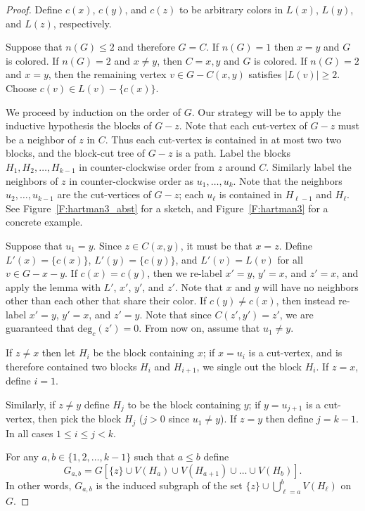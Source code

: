 \documentclass[12pt,letterpaper]{article}
\theoremstyle{plain}
\theoremstyle{definition}
\theoremstyle{break}
\begin{document}
\begin{proof}
Define $c(x)$, $c(y)$, and $c(z)$ to be arbitrary colors in $L(x)$,
$L(y)$, and $L(z)$, respectively.

Suppose that $n(G)\le 2$ and therefore $G=C$.
If $n(G)=1$ then $x=y$ and $G$ is colored.
If $n(G)= 2$ and $x\ne y$, then $C=x,y$ and $G$ is colored.
If $n(G)=2$ and $x=y$, then the remaining vertex
$v\in G-C(x,y)$ satisfies $|L(v)|\ge 2$. Choose $c(v)\in L(v)-\{c(x)\}$.

We proceed by induction on the order of $G$.
Our strategy will be to apply the inductive hypothesis
the blocks of $G-z$.
Note that each cut-vertex of $G-z$
must be a neighbor of $z$ in $C$.
Thus each cut-vertex is contained in at most two
two blocks, and the block-cut tree of $G-z$ is a path.
Label the blocks $H_1,H_2,\ldots,H_{k-1}$ in counter-clockwise
order from $z$ around $C$. Similarly label the neighbors
of $z$ in counter-clockwise order as $u_1,\ldots,u_{k}$. Note that
the neighbors $u_2,\ldots,u_{k-1}$ are the cut-vertices of $G-z$; each
$u_\ell$ is contained in $H_{\ell-1}$ and $H_{\ell}$. See
Figure~\ref{F:hartman3_abst} for a sketch, and Figure~\ref{F:hartman3} for a
concrete example.

Suppose that $u_1=y$. Since $z\in C(x,y)$, it must be that $x=z$.
Define $L'(x)=\{c(x)\}$, $L'(y)=\{c(y)\}$,
and $L'(v)=L(v)$ for all $v\in G-x-y$. 
If $c(x)=c(y)$, then we re-label $x'=y$, $y'=x$, and $z'=x$,
and apply the lemma with $L'$, $x'$, $y'$, and $z'$.
Note that $x$ and $y$ will have no
neighbors other than each other
that share their color. If $c(y)\ne c(x)$, then instead re-label $x'=y$,
$y'=x$, and $z'=y$. Note that since $C(z',y')=z'$, we are guaranteed that
$\text{deg}_c(z')=0$. From now on, assume that $u_1\ne y$.

If $z\ne x$ then let $H_i$ be the block 
containing $x$; if $x=u_i$ is a cut-vertex, and is therefore
contained two blocks $H_i$ and $H_{i+1}$, we
single out the block $H_i$.
If $z=x$, define $i=1$.

Similarly, if $z\ne y$ define $H_j$ to be the
block containing $y$; if $y=u_{j+1}$ is a cut-vertex, then pick
the block $H_j$ ($j>0$ since $u_1\ne y$).
If $z = y$ then define $j=k-1$. In all cases $1\le i\le j< k$.

For any $a,b\in\{1,2,\ldots,k-1\}$
such that $a\le b$ define
$$ G_{a,b}=G\left[\{z\}\cup V(H_a)\cup V(H_{a+1})\cup \ldots\cup V(H_b)\right].$$ 
In other words, $G_{a,b}$ is the induced subgraph of the set
$\{z\}\cup \bigcup_{\ell=a}^bV(H_\ell)$ on $G$.


\end{proof}
\end{document}
